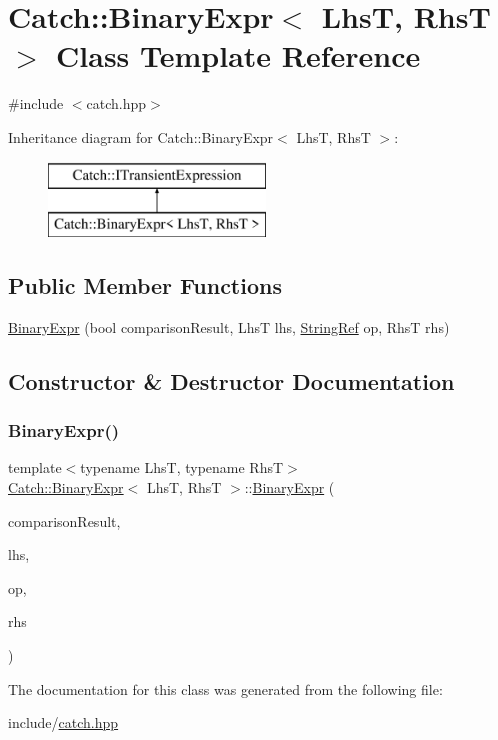 \hypertarget{classCatch_1_1BinaryExpr}{}\section{Catch\+:\+:Binary\+Expr$<$ LhsT, RhsT $>$ Class Template Reference}
\label{classCatch_1_1BinaryExpr}


{\ttfamily \#include $<$catch.\+hpp$>$}

Inheritance diagram for Catch\+:\+:Binary\+Expr$<$ LhsT, RhsT $>$\+:\begin{figure}[H]
\begin{center}
\leavevmode
\includegraphics[height=2.000000cm]{classCatch_1_1BinaryExpr}
\end{center}
\end{figure}
\subsection*{Public Member Functions}
\begin{DoxyCompactItemize}
\item 
\mbox{\hyperlink{classCatch_1_1BinaryExpr_a657d66346aef97a760c22776fe6008b6}{Binary\+Expr}} (bool comparison\+Result, LhsT lhs, \mbox{\hyperlink{classCatch_1_1StringRef}{String\+Ref}} op, RhsT rhs)
\end{DoxyCompactItemize}


\subsection{Constructor \& Destructor Documentation}
\mbox{\label{classCatch_1_1BinaryExpr_a657d66346aef97a760c22776fe6008b6}} 
\subsubsection{\texorpdfstring{Binary\+Expr()}{BinaryExpr()}}
{\footnotesize\ttfamily template$<$typename LhsT, typename RhsT$>$ \\
\mbox{\hyperlink{classCatch_1_1BinaryExpr}{Catch\+::\+Binary\+Expr}}$<$ LhsT, RhsT $>$\+::\mbox{\hyperlink{classCatch_1_1BinaryExpr}{Binary\+Expr}} (\begin{DoxyParamCaption}\item[{bool}]{comparison\+Result,  }\item[{LhsT}]{lhs,  }\item[{\mbox{\hyperlink{classCatch_1_1StringRef}{String\+Ref}}}]{op,  }\item[{RhsT}]{rhs }\end{DoxyParamCaption})\hspace{0.3cm}{\ttfamily [inline]}}



The documentation for this class was generated from the following file\+:\begin{DoxyCompactItemize}
\item 
include/\mbox{\hyperlink{catch_8hpp}{catch.\+hpp}}\end{DoxyCompactItemize}
